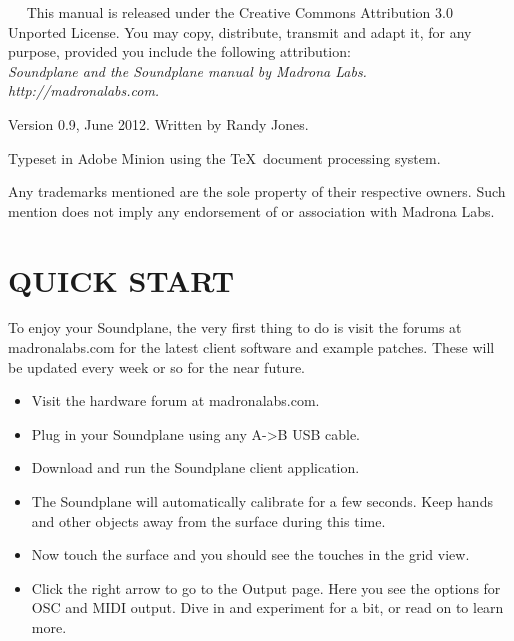\thispagestyle{empty}
{
\raggedright
\ \ \vskip 2in
\noindent 
This manual is released under the Creative Commons Attribution 3.0 Unported License.  You may copy, distribute, transmit and adapt it, for any purpose, provided you include the following attribution: \\
{\itshape Soundplane and the Soundplane manual by Madrona Labs. 
http://madronalabs.com.}

\vspace{1 em}
\noindent 
Version 0.9, June 2012.  Written by Randy Jones.

\vspace{1 em}
\noindent 

\vspace{1 em}
\noindent 
Typeset in Adobe Minion using the \TeX \ document processing system. 

\vspace{1 em}
Any trademarks mentioned are the sole property of their respective owners.  Such mention does not imply any endorsement of or association with Madrona Labs. 
}





%
\chapter{QUICK START}

To enjoy your Soundplane, the very first thing to do is visit the forums at madronalabs.com for the latest client software and example patches.  These will be updated every week or so for the near future.  

\begin{itemize}
\item Visit the hardware forum at madronalabs.com.
\item Plug in your Soundplane using any A->B USB cable.
\item Download and run the Soundplane client application. 
\item The Soundplane will automatically calibrate for a few seconds.  Keep hands and other objects away from the surface during this time.
\item Now touch the surface and you should see the touches in the grid view.
\item Click the right arrow to go to the Output page. Here you see the options for OSC and MIDI output.  Dive in and experiment for a bit, or read on to learn more. 

\end{itemize}


